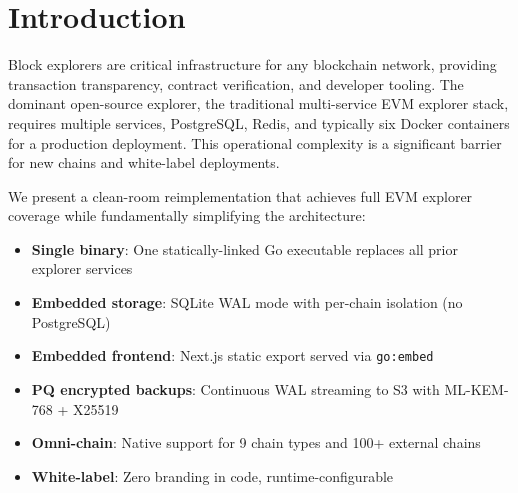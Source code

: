 \section{Introduction}


Block explorers are critical infrastructure for any blockchain network, providing transaction
transparency, contract verification, and developer tooling. The dominant open-source explorer,
the traditional multi-service EVM explorer stack, requires multiple services, PostgreSQL,
Redis, and typically six Docker containers for a production deployment. This operational
complexity is a significant barrier for new chains and white-label deployments.

We present a clean-room reimplementation that achieves full EVM explorer coverage while fundamentally simplifying the architecture:

\begin{itemize}
  \item \textbf{Single binary}: One statically-linked Go executable replaces all prior explorer services
  \item \textbf{Embedded storage}: SQLite WAL mode with per-chain isolation (no PostgreSQL)
  \item \textbf{Embedded frontend}: Next.js static export served via \texttt{go:embed}
  \item \textbf{PQ encrypted backups}: Continuous WAL streaming to S3 with ML-KEM-768 + X25519
  \item \textbf{Omni-chain}: Native support for 9 chain types and 100+ external chains
  \item \textbf{White-label}: Zero branding in code, runtime-configurable
\end{itemize}


